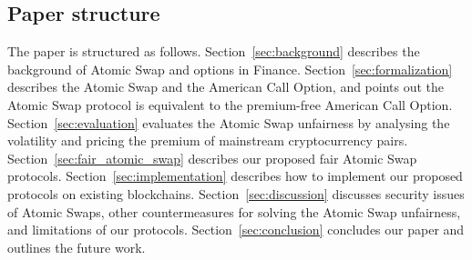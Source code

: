 \subsection{Paper structure}

The paper is structured as follows.
Section~\ref{sec:background} describes the background of Atomic Swap and options in Finance.
Section~\ref{sec:formalization} describes the Atomic Swap and the American Call Option, and points out the Atomic Swap protocol is equivalent to the premium-free American Call Option.
Section~\ref{sec:evaluation} evaluates the Atomic Swap unfairness by analysing the volatility and pricing the premium of mainstream cryptocurrency pairs.
Section~\ref{sec:fair_atomic_swap} describes our proposed fair Atomic Swap protocols.
Section~\ref{sec:implementation} describes how to implement our proposed protocols on existing blockchains.
Section~\ref{sec:discussion} discusses security issues of Atomic Swaps, other countermeasures for solving the Atomic Swap unfairness, and limitations of our protocols.
Section~\ref{sec:conclusion} concludes our paper and outlines the future work.
